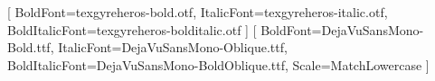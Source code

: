\usepackage{fvextra}
\usepackage{xurl}
\usepackage{fancyhdr}
\usepackage{needspace}
\usepackage{microtype}


\setmainfont{texgyreheros-regular.otf}[
  BoldFont=texgyreheros-bold.otf,
  ItalicFont=texgyreheros-italic.otf,
  BoldItalicFont=texgyreheros-bolditalic.otf
]
\setmonofont{DejaVuSansMono.ttf}[
  BoldFont=DejaVuSansMono-Bold.ttf,
  ItalicFont=DejaVuSansMono-Oblique.ttf,
  BoldItalicFont=DejaVuSansMono-BoldOblique.ttf,
  Scale=MatchLowercase
]

\setlength{\emergencystretch}{3em}
\raggedbottom


\pagestyle{fancy}
\fancyhf{}
\fancyfoot[C]{\small\thepage}
\renewcommand{\headrulewidth}{0pt}
\renewcommand{\footrulewidth}{0pt}
\setlength{\headheight}{14pt}

\makeatletter
\renewcommand{\section}{\needspace{5\baselineskip}\@startsection
  {section}{1}{\z@}{-3.5ex \@plus -1ex \@minus -.2ex}
  {2.3ex \@plus.2ex}{\normalfont\Large\bfseries}}
\renewcommand{\subsection}{\needspace{4\baselineskip}\@startsection
  {subsection}{2}{\z@}{-3.25ex\@plus -1ex \@minus -.2ex}
  {1.5ex \@plus .2ex}{\normalfont\large\bfseries}}
\makeatother
